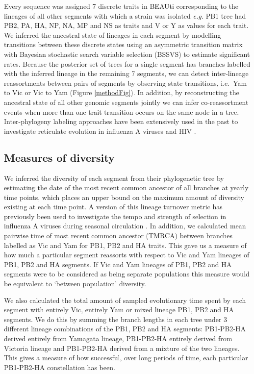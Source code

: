 \documentclass[11pt,oneside,letterpaper]{article}
\begin{document}
Every sequence was assigned 7 discrete traits in BEAUti corresponding to the lineages of all other segments with which a strain was isolated \textit{e.g.} PB1 tree had PB2, PA, HA, NP, NA, MP and NS as traits and V or Y as values for each trait.
We inferred the ancestral state of lineages in each segment by modelling transitions between these discrete states using an asymmetric transition matrix \citep{lemey2009} with Bayesian stochastic search variable selection (BSSVS) to estimate significant rates.
Because the posterior set of trees for a single segment has branches labelled with the inferred lineage in the remaining 7 segments, we can detect inter-lineage reassortments between pairs of segments by observing state transitions, i.e.\ Yam to Vic or Vic to Yam (Figure \ref{methodFig}).
In addition, by reconstructing the ancestral state of all other genomic segments jointly we can infer co-reassortment events when more than one trait transition occurs on the same node in a tree.
Inter-phylogeny labeling approaches have been extensively used in the past to investigate reticulate evolution in influenza A viruses and HIV \citep{lycett2012,ward2013,lu2014}.

\subsection*{Measures of diversity}
We inferred the diversity of each segment from their phylogenetic tree by estimating the date of the most recent common ancestor of all branches at yearly time points, which places an upper bound on the maximum amount of diversity existing at each time point.
A version of this lineage turnover metric has previously been used to investigate the tempo and strength of selection in influenza A viruses during seasonal circulation \citep{bedford2011}.
In addition, we calculated mean pairwise time of most recent common ancestor (TMRCA) between branches labelled as Vic and Yam for PB1, PB2 and HA traits.
This gave us a measure of how much a particular segment reassorts with respect to Vic and Yam lineages of PB1, PB2 and HA segments.
If Vic and Yam lineages of PB1, PB2 and HA segments were to be considered as being separate populations this measure would be equivalent to `between population' diversity.

We also calculated the total amount of sampled evolutionary time spent by each segment with entirely Vic, entirely Yam or mixed lineage PB1, PB2 and HA segments.
We do this by summing the branch lengths in each tree under 3 different lineage combinations of the PB1, PB2 and HA segments: PB1-PB2-HA derived entirely from Yamagata lineage, PB1-PB2-HA entirely derived from Victoria lineage and PB1-PB2-HA derived from a mixture of the two lineages.
This gives a measure of how successful, over long periods of time, each particular PB1-PB2-HA constellation has been.
\end{document}
